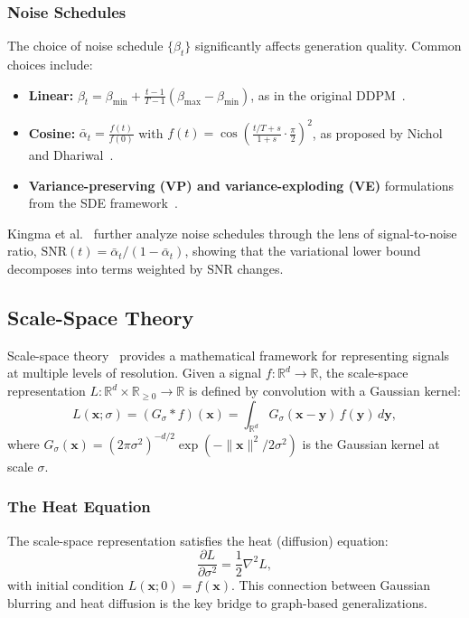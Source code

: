 \documentclass[12pt,a4paper]{article}
\providecommand{\R}{}
\renewcommand{\R}{\mathbb{R}}
\newcommand{\SNR}{\mathrm{SNR}}
\newcommand{\bx}{\bm{x}}
\begin{document}
\subsubsection{Noise Schedules}

The choice of noise schedule $\{\beta_t\}$ significantly affects generation quality. Common choices include:
\begin{itemize}
    \item \textbf{Linear:} $\beta_t = \beta_{\min} + \frac{t-1}{T-1}(\beta_{\max} - \beta_{\min})$, as in the original DDPM~\cite{ho2020ddpm}.
    \item \textbf{Cosine:} $\bar{\alpha}_t = \frac{f(t)}{f(0)}$ with $f(t) = \cos\!\left(\frac{t/T + s}{1 + s} \cdot \frac{\pi}{2}\right)^2$, as proposed by Nichol and Dhariwal~\cite{nichol2021improved}.
    \item \textbf{Variance-preserving (VP) and variance-exploding (VE)} formulations from the SDE framework~\cite{song2021scorebased}.
\end{itemize}
Kingma et al.~\cite{kingma2021variational} further analyze noise schedules through the lens of signal-to-noise ratio, $\SNR(t) = \bar{\alpha}_t / (1 - \bar{\alpha}_t)$, showing that the variational lower bound decomposes into terms weighted by $\SNR$ changes.

\subsection{Scale-Space Theory}\label{sec:bg_scalespace}

Scale-space theory~\cite{lindeberg1994scalespace, witkin1987scalespace, koenderink1984structure} provides a mathematical framework for representing signals at multiple levels of resolution. Given a signal $f: \R^d \to \R$, the scale-space representation $L: \R^d \times \R_{\geq 0} \to \R$ is defined by convolution with a Gaussian kernel:
\begin{equation}\label{eq:scalespace}
    L(\bx; \sigma) = (G_\sigma * f)(\bx) = \int_{\R^d} G_\sigma(\bx - \bm{y})\, f(\bm{y})\, d\bm{y},
\end{equation}
where $G_\sigma(\bx) = (2\pi\sigma^2)^{-d/2} \exp(-\|\bx\|^2 / 2\sigma^2)$ is the Gaussian kernel at scale $\sigma$.

\subsubsection{The Heat Equation}

The scale-space representation satisfies the heat (diffusion) equation:
\begin{equation}\label{eq:heat}
    \frac{\partial L}{\partial \sigma^2} = \frac{1}{2} \nabla^2 L,
\end{equation}
with initial condition $L(\bx; 0) = f(\bx)$. This connection between Gaussian blurring and heat diffusion is the key bridge to graph-based generalizations.
\end{document}
